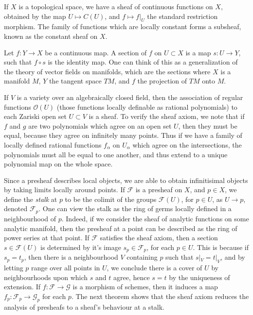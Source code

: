 \begin{example}
    If $X$ is a topological space, we have a sheaf of continuous functions on $X$, obtained by the map $U \mapsto C(U)$, and $f \mapsto f|_U$ the standard restriction morphism. The family of functions which are locally constant forms a subsheaf, known as the constant sheaf on $X$.
\end{example}

\begin{example}
    Let $f: Y \to X$ be a continuous map. A section of $f$ on $U \subset X$ is a map $s: U \to Y$, such that $f \circ s$ is the identity map. One can think of this as a generalization of the theory of vector fields on manifolds, which are the sections where $X$ is a manifold $M$, $Y$ the tangent space $TM$, and $f$ the projection of $TM$ onto $M$.
\end{example}

\begin{example}
    If $V$ is a variety over an algebraically closed field, then the association of regular functions $\mathcal{O}(U)$ (those functions locally definable as rational polynomials) to each Zariski open set $U \subset V$ is a sheaf. To verify the sheaf axiom, we note that if $f$ and $g$ are two polynomials which agree on an open set $U$, then they must be equal, because they agree on infinitely many points. Thus if we have a family of locally defined rational functions $f_\alpha$ on $U_\alpha$ which agree on the intersections, the polynomials must all be equal to one another, and thus extend to a unique polynomial map on the whole space.
\end{example}

Since a presheaf describes local objects, we are able to obtain infinitisimal objects by taking limits locally around points. If $\mathcal{F}$ is a presheaf on $X$, and $p \in X$, we define the \emph{stalk} at $p$ to be the colimit of the groups $\mathcal{F}(U)$, for $p \in U$, as $U \to p$, denoted $\mathcal{F}_p$. One can view the stalk as the ring of germs locally defined in a neighbourhood of $p$. Indeed, if we consider the sheaf of analytic functions on some analytic manifold, then the presheaf at a point can be described as the ring of power series at that point. If $\mathcal{F}$ satisfies the sheaf axiom, then a section $s \in \mathcal{F}(U)$ is determined by it's image $s_p \in \mathcal{F}_p$, for each $p \in U$. This is because if $s_p = t_p$, then there is a neighbourhood $V$ containing $p$ such that $s|_V = t|_V$, and by letting $p$ range over all points in $U$, we conclude there is a cover of $U$ by neighbourhoods upon which $s$ and $t$ agree, hence $s = t$ by the uniqueness of extension. If $f: \mathcal{F} \to \mathcal{G}$ is a morphism of schemes, then it induces a map $f_p: \mathcal{F}_p \to \mathcal{G}_p$ for each $p$. The next theorem shows that the sheaf axiom reduces the analysis of presheafs to a sheaf's behaviour at a stalk.

